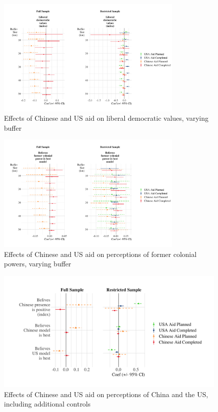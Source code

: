 \documentclass[9pt]{article}
\begin{document}
\begin{figure}[H]
\centering
\includegraphics[width=0.8\textwidth]{figures/figure_a11.png}
\caption{Effects of Chinese and US aid on liberal democratic values, varying buffer}
\end{figure}

\begin{figure}[H]
\centering
\includegraphics[width=0.8\textwidth]{figures/figure_a12.png}
\caption{Effects of Chinese and US aid on perceptions of former colonial powers, varying buffer}
\end{figure}

\begin{figure}[H]
\centering
\includegraphics[width=1\textwidth]{figures/figure_a13.png}
\caption{Effects of Chinese and US aid on perceptions of China and the US, including additional controls}
\end{figure}
\end{document}
